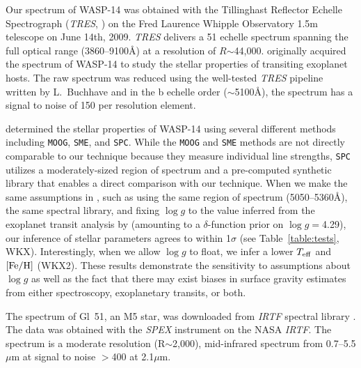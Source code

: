 \documentclass[iop,floatfix]{emulateapj}
\newcommand{\Z}{[{\rm Fe}/{\rm H}]}
\begin{document}
Our spectrum of WASP-14 was obtained with the Tillinghast Reflector Echelle Spectrograph (\emph{TRES}, \citealt{mink11}) on the Fred Laurence Whipple Observatory 1.5m telescope on June 14th, 2009. \emph{TRES} delivers a 51 echelle spectrum spanning the full optical range (3860--9100\AA) at a resolution of $R$$\sim$44,000. \citet{torres12} originally acquired the spectrum of WASP-14 to study the stellar properties of transiting exoplanet hosts. The raw spectrum was reduced using the well-tested \emph{TRES} pipeline written by L.~Buchhave and in the b echelle order ($\sim$5100\AA), the spectrum has a signal to noise of 150 per resolution element.

\citet{torres12} determined the stellar properties of WASP-14 using several different methods including {\tt MOOG}, {\tt SME}, and {\tt SPC}. While the {\tt MOOG} and {\tt SME} methods are not directly comparable to our technique because they measure individual line strengths, {\tt SPC} utilizes a moderately-sized region of spectrum and a pre-computed synthetic library that enables a direct comparison with our technique. When we make the same assumptions in \citet{torres12}, such as using the same region of spectrum (5050--5360\AA), the same spectral library, and fixing $\log g$ to the value inferred from the exoplanet transit analysis by \citet{joshi09} (amounting to a $\delta$-function prior on $\log g$$=$4.29), our inference of stellar parameters agrees to within 1$\sigma$ (see Table~\ref{table:tests}, WKX). Interestingly, when we allow $\log g$ to float, we infer a lower $T_{\rm eff}$ and $\Z$ (WKX2). These results demonstrate the sensitivity to assumptions about $\log g$ as well as the fact that there may exist biases in surface gravity estimates from either spectroscopy, exoplanetary transits, or both. 

The spectrum of Gl~51, an M5 star, was downloaded from \emph{IRTF} spectral library \citep{cushing05, rayner09}. The data was obtained with the \emph{SPEX} instrument \citep{rayner03} on the NASA \emph{IRTF}. The spectrum is a moderate resolution (R$\sim$2,000), mid-infrared spectrum from 0.7--5.5$\mu$m at signal to noise $>$400 at 2.1$\mu$m.
\end{document}
